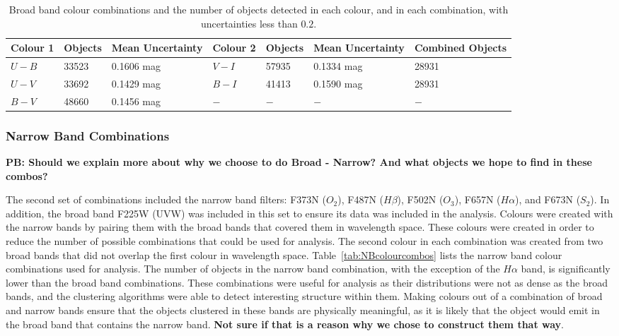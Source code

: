 \begin{table}
\centering
\caption{Broad band colour combinations and the number of objects detected in each colour, and in each combination, with uncertainties less than $0.2$.}
\label{tab:BBcolours}
\begin{tabular}{lllllll}
\hline\hline
Colour 1 & Objects & Mean Uncertainty & Colour 2 & Objects & Mean Uncertainty & Combined Objects \\
\hline
$U - B$ &  33523 & 0.1606 mag & $V - I$ &  57935 & 0.1334 mag & 28931\\
$U - V$ &  33692 & 0.1429 mag & $B - I$ &  41413 & 0.1590 mag & 28931\\
$B - V$ &  48660 & 0.1456 mag & $ - $ & $ - $ & $ - $ & $ - $ \\
\hline
\end{tabular}
\end{table}

\subsubsection{Narrow Band Combinations}

\textbf{PB: Should we explain more about why we choose to do Broad - Narrow? And what objects we hope to find in these combos?}

The second set of combinations included the narrow band filters: F373N ($O_{2}$), F487N ($H\beta$), F502N ($O_{3}$), F657N ($H\alpha$), and F673N ($S_{2}$).
In addition, the broad band F225W (UVW) was included in this set to ensure its data was included in the analysis. 
Colours were created with the narrow bands by pairing them with the broad bands that covered them in wavelength space.
These colours were created in order to reduce the number of possible combinations that could be used for analysis.
The second colour in each combination was created from two broad bands that did not overlap the first colour in wavelength space.
Table~\ref{tab:NBcolourcombos} lists the narrow band colour combinations used for analysis.
The number of objects in the narrow band combination, with the exception of the $H\alpha$ band, is significantly lower than the broad band combinations.
These combinations were useful for analysis as their distributions were not as dense as the broad bands, and the clustering algorithms were able to detect interesting structure within them.
Making colours out of a combination of broad and narrow bands ensure that the objects clustered in these bands are physically meaningful, as it is likely that the object would emit in the broad band that contains the narrow band. \textbf{Not sure if that is a reason why we chose to construct them that way}.

